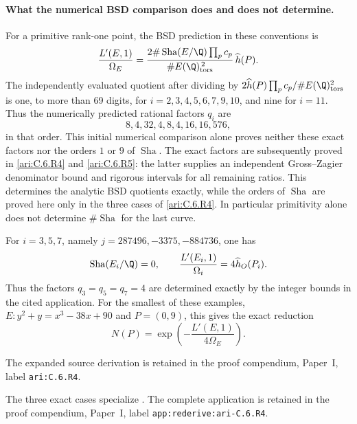 \paragraph{What the numerical BSD comparison does and does not determine.}
For a primitive rank-one point, the BSD prediction in these conventions is
\[
 \frac{L'(E,1)}{\Omega_E}
 =\frac{2\#\operatorname{Sha}(E/\Q)\prod_pc_p}
        {\#E(\Q)_{\rm tors}^{\,2}}\,\widehat h(P).
\]
The independently evaluated quotient after dividing by
$2\widehat h(P)\prod_pc_p/\#E(\Q)_{\rm tors}^2$ is one, to
more than 69 digits, for $i=2,3,4,5,6,7,9,10$, and nine for
$i=11$. Thus the numerically predicted rational factors $q_i$ are
\[
 8,4,32,4,8,4,16,16,576,
\]
in that order. This initial numerical comparison alone proves neither
these exact factors nor the orders $1$ or $9$ of $\operatorname{Sha}$.
The exact factors are subsequently proved in \ref{ari:C.6.R4} and \ref{ari:C.6.R5}:
the latter supplies an independent Gross--Zagier denominator bound
and rigorous intervals for all remaining ratios. This determines
the analytic BSD quotients exactly, while the orders of
$\operatorname{Sha}$ are proved here only in the three cases of
\ref{ari:C.6.R4}. In particular primitivity alone does not determine
$\#\operatorname{Sha}$ for the last curve.

\begin{cited}\hypertarget{tag-0013}{}\label{ari:C.6.R4}

For $i=3,5,7$, namely $j=287496,-3375,-884736$, one has
\[
 \operatorname{Sha}(E_i/\Q)=0,\qquad
 \frac{L'(E_i,1)}{\Omega_i}=4\widehat h_O(P_i).
\]
Thus the factors $q_3=q_5=q_7=4$ are determined exactly by the integer bounds in the cited application. For the smallest of these examples,
$E:y^2+y=x^3-38x+90$ and $P=(0,9)$, this gives the exact
reduction
\[
 N(P)=\exp\left(-\frac{L'(E,1)}{4\Omega_E}\right).
\]
\end{cited}

The expanded source derivation is retained in the proof compendium, Paper~I, label \nolinkurl{ari:C.6.R4}.




The three exact cases specialize \citet[Definition~1.1, Theorem~1.2 and Table~9]{miller2011}. The complete application is retained in the proof compendium, Paper~I, label \nolinkurl{app:rederive:ari-C.6.R4}.


